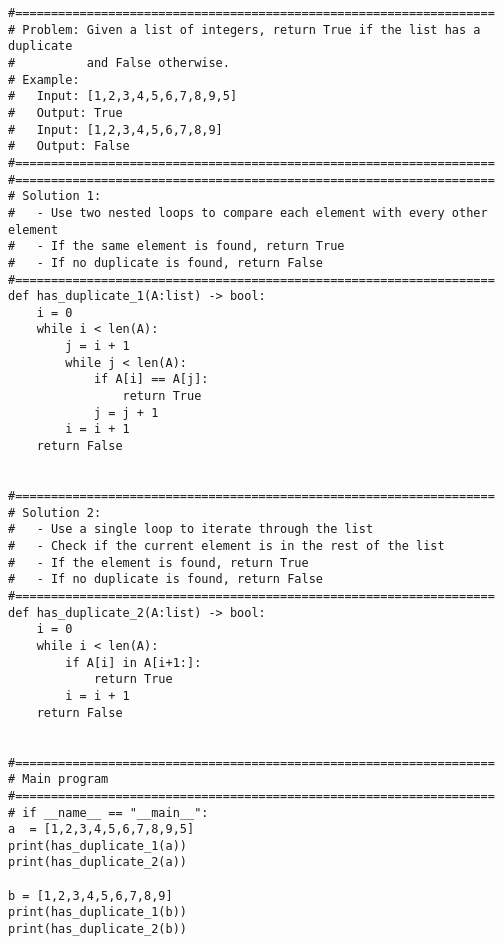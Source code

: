 \documentclass[addpoints,11pt]{exam}
\begin{document}
\begin{questions}
\begin{verbatim}
#===================================================================
# Problem: Given a list of integers, return True if the list has a duplicate
#          and False otherwise.
# Example:
#   Input: [1,2,3,4,5,6,7,8,9,5]
#   Output: True
#   Input: [1,2,3,4,5,6,7,8,9]
#   Output: False
#===================================================================
#===================================================================
# Solution 1:
#   - Use two nested loops to compare each element with every other element
#   - If the same element is found, return True
#   - If no duplicate is found, return False
#===================================================================
def has_duplicate_1(A:list) -> bool:
	i = 0
	while i < len(A):
		j = i + 1
		while j < len(A):
			if A[i] == A[j]:
				return True
			j = j + 1
		i = i + 1
	return False


#===================================================================
# Solution 2:
#   - Use a single loop to iterate through the list
#   - Check if the current element is in the rest of the list
#   - If the element is found, return True
#   - If no duplicate is found, return False
#===================================================================
def has_duplicate_2(A:list) -> bool:
	i = 0
	while i < len(A):
		if A[i] in A[i+1:]:
			return True
		i = i + 1
	return False


#===================================================================
# Main program
#===================================================================
# if __name__ == "__main__":
a  = [1,2,3,4,5,6,7,8,9,5]
print(has_duplicate_1(a))
print(has_duplicate_2(a))

b = [1,2,3,4,5,6,7,8,9]
print(has_duplicate_1(b))
print(has_duplicate_2(b))
\end{verbatim}
\begin{solutionorbox}
    \begin{parts}

\end{parts}
\end{solutionorbox}
\end{questions}
\end{document}
